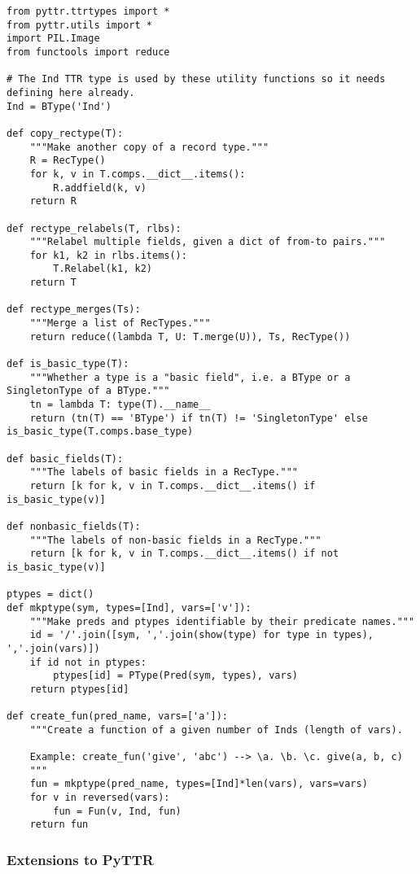 \begin{lstlisting}[label=lst:utility,caption=Utility functions]
from pyttr.ttrtypes import *
from pyttr.utils import *
import PIL.Image
from functools import reduce

# The Ind TTR type is used by these utility functions so it needs defining here already.
Ind = BType('Ind')
    
def copy_rectype(T):
    """Make another copy of a record type."""
    R = RecType()
    for k, v in T.comps.__dict__.items():
        R.addfield(k, v)
    return R

def rectype_relabels(T, rlbs):
    """Relabel multiple fields, given a dict of from-to pairs."""
    for k1, k2 in rlbs.items():
        T.Relabel(k1, k2)
    return T

def rectype_merges(Ts):
    """Merge a list of RecTypes."""
    return reduce((lambda T, U: T.merge(U)), Ts, RecType())

def is_basic_type(T):
    """Whether a type is a "basic field", i.e. a BType or a SingletonType of a BType."""
    tn = lambda T: type(T).__name__
    return (tn(T) == 'BType') if tn(T) != 'SingletonType' else is_basic_type(T.comps.base_type)

def basic_fields(T):
    """The labels of basic fields in a RecType."""
    return [k for k, v in T.comps.__dict__.items() if is_basic_type(v)]

def nonbasic_fields(T):
    """The labels of non-basic fields in a RecType."""
    return [k for k, v in T.comps.__dict__.items() if not is_basic_type(v)]

ptypes = dict()
def mkptype(sym, types=[Ind], vars=['v']):
    """Make preds and ptypes identifiable by their predicate names."""
    id = '/'.join([sym, ','.join(show(type) for type in types), ','.join(vars)])
    if id not in ptypes:
        ptypes[id] = PType(Pred(sym, types), vars)
    return ptypes[id]

def create_fun(pred_name, vars=['a']):
    """Create a function of a given number of Inds (length of vars).
    
    Example: create_fun('give', 'abc') --> \a. \b. \c. give(a, b, c)
    """
    fun = mkptype(pred_name, types=[Ind]*len(vars), vars=vars)
    for v in reversed(vars):
        fun = Fun(v, Ind, fun)
    return fun
\end{lstlisting}

\subsubsection{Extensions to PyTTR}

